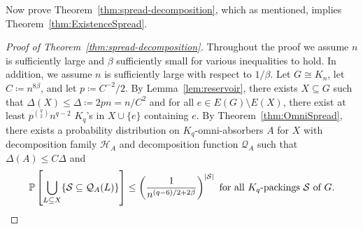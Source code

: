 \documentclass[11pt]{article}
\numberwithin{equation}{section}
\newcounter{i}
\theoremstyle{plain}
\theoremstyle{plain} %
\theoremstyle{definition}
\newcommand{\cQ}{\mathcal{Q}}
\newcommand{\cS}{\mathcal{S}}
\newcommand{\cH}{\mathcal{H}}
\newcommand{\Prob}[1]{\ensuremath{%
\mathbb P\left[#1\right]
}}
\begin{document}
Now prove Theorem~\ref{thm:spread-decomposition}, which as mentioned, implies Theorem~\ref{thm:ExistenceSpread}.
\begin{proof}[Proof of Theorem~\ref{thm:spread-decomposition}]
    Throughout the proof we assume $n$ is sufficiently large and $\beta$ sufficiently small for various inequalities to hold.  In addition, we assume $n$ is sufficiently large with respect to $1 / \beta$.  
  Let $G \cong K_n$, let $C \coloneqq n^{8\beta}$, and let $p \coloneqq C^{-2}/2$.  By Lemma~\ref{lem:reservoir}, there exists $X \subseteq G$ such that $\Delta(X) \leq \Delta \coloneqq 2pn = n/C^2$ and for all $e \in E(G) \setminus E(X)$, there exist at least $p^{\binom{q}{2}}n^{q - 2}$ $K_q$'s in $X \cup \{e\}$ containing $e$.
  By Theorem~\ref{thm:OmniSpread}, there exists a probability distribution on $K_q$-omni-absorbers $A$ for $X$ with decomposition family $\cH_A$ and decomposition function $\cQ_A$ such that $\Delta(A) \leq C\Delta$ and 
  \begin{equation}\label{eqn:omni-absorber-spreadness}
      \Prob{\bigcup_{L\subseteq X}\{\cS \subseteq \cQ_A(L)\}}  \le \left(\frac{1}{n^{(q - 6)/2 + 2\beta}}\right)^{|\cS|} \text{ for all $K_q$-packings $\cS$ of $G$.}
  \end{equation}
  

\end{proof}
\end{document}
